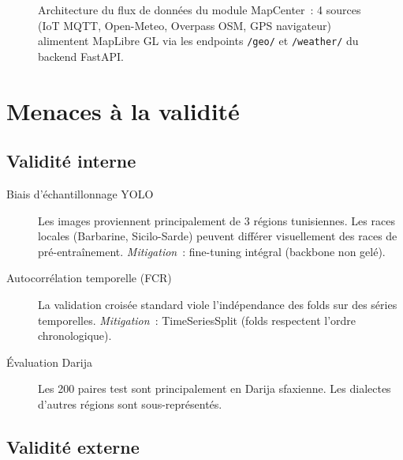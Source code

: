 \begin{figure}[H]
{
}%
\caption{Architecture du flux de données du module MapCenter~: 4 sources
(IoT MQTT, Open-Meteo, Overpass OSM, GPS navigateur) alimentent MapLibre GL
via les endpoints \texttt{/geo/} et \texttt{/weather/} du backend FastAPI.}
\label{fig:gis_architecture}
\end{figure}

\section{Menaces à la validité}

\subsection{Validité interne}

\begin{description}
  \item[Biais d'échantillonnage YOLO] Les images proviennent principalement de
        3 régions tunisiennes. Les races locales (Barbarine, Sicilo-Sarde) peuvent
        différer visuellement des races de pré-entraînement.
        \textit{Mitigation}~: fine-tuning intégral (backbone non gelé).
  \item[Autocorrélation temporelle (FCR)] La validation croisée standard viole
        l'indépendance des folds sur des séries temporelles.
        \textit{Mitigation}~: TimeSeriesSplit (folds respectent l'ordre chronologique).
  \item[Évaluation Darija] Les 200 paires test sont principalement en Darija
        sfaxienne. Les dialectes d'autres régions sont sous-représentés.
\end{description}

\subsection{Validité externe}

